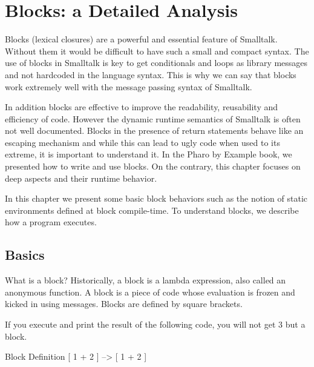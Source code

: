 \documentclass[a4paper,10pt,twoside]{book}
\begin{document}
\fi
\sloppy
\chapter{Blocks: a Detailed Analysis}


Blocks (lexical closures) are a powerful and essential feature of Smalltalk. Without them it
would be difficult to have such a small and compact syntax. The use of blocks in Smalltalk
is key to get conditionals and loops as library messages and not hardcoded in the language syntax. This is why we can say that
blocks work extremely well with the message passing syntax of Smalltalk.

In addition blocks are  effective to improve the readability, reusability and efficiency of code.
However the dynamic runtime semantics of Smalltalk is often not well documented. Blocks in the presence of return statements behave like an escaping mechanism and while this can lead to ugly code when used to its extreme, it is important to understand it. In the Pharo by Example book, we presented how to write and use blocks. On the contrary, this chapter focuses on deep aspects and their runtime behavior.

In this chapter we present some basic block behaviors such as the notion of static environments defined at block compile-time. To understand blocks, we describe how  a program executes.

\section{Basics}

What is a block? Historically, a block is a lambda expression, also called an anonymous function. A block is a piece of code whose evaluation is frozen and kicked in using messages. Blocks are defined by square brackets.

If you execute and print the result of the following code, you will not get 3 but a block.

\begin{code}{Block Definition}
[ 1 + 2 ] --> [ 1 + 2 ]
\end{code}
\end{document}
